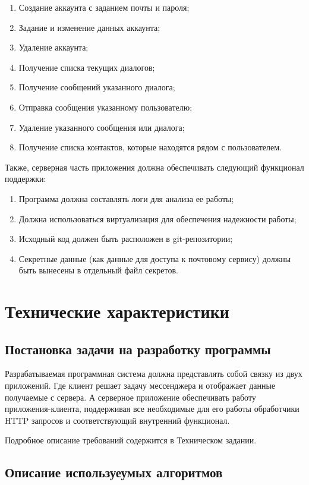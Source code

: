 \documentclass[explnote]{espd}
\begin{document}
\begin{enumerate}
\item Создание аккаунта с заданием почты и пароля;
\item Задание и изменение данных аккаунта;
\item Удаление аккаунта;
\item Получение списка текущих диалогов;
\item Получение сообщений указанного диалога;
\item Отправка сообщения указанному пользователю;
\item Удаление указанного сообщения или диалога;
\item Получение списка контактов, которые находятся рядом с пользователем.
\end{enumerate}

Также, серверная часть приложения должна обеспечивать следующий функционал поддержки:

\begin{enumerate}
\item Программа должна составлять логи для анализа ее работы;
\item Должна использоваться виртуализация для обеспечения надежности работы;
\item Исходный код должен быть расположен в git-репозитории;
\item Секретные данные (как данные для доступа к почтовому сервису) должны быть вынесены в отдельный файл секретов.
\end{enumerate}

\section{Технические характеристики}
\subsection{Постановка задачи на разработку программы}
Разрабатываемая программная система должна представлять собой связку из двух приложений. Где клиент решает задачу мессенджера и отображает данные получаемые с сервера. А серверное приложение обеспечивать работу приложения-клиента, поддерживая все необходимые для его работы обработчики HTTP запросов и соответствующий внутренний функционал. 

Подробное описание требований содержится в Техническом задании.

\subsection{Описание используеумых алгоритмов}
\end{document}
